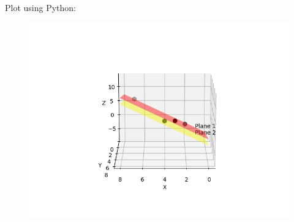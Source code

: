 \documentclass[journal,12pt,onecolumn]{IEEEtran}
\begin{document}
Plot using Python:
\begin{figure}[H]
	\centering
	\includegraphics[scale=0.5]{img2}
	\caption*{}
	\label{img2}
\end{figure}
\end{document}
